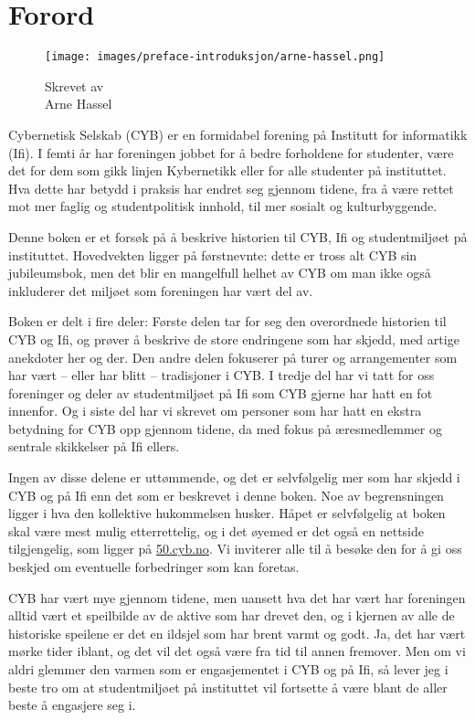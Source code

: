 \chapter*{Forord}

\begin{wrapfigure}{r}{3cm}
\vspace{-180pt}
\centering
\texttt{[image: images/preface-introduksjon/arne-hassel.png]}
\captionsetup{labelformat=empty}
\caption{Skrevet av\\Arne Hassel}
\end{wrapfigure}

Cybernetisk Selskab (CYB) er en formidabel forening på Institutt for informatikk (Ifi). I femti år har foreningen jobbet for å bedre forholdene for studenter, være det for dem som gikk linjen Kybernetikk eller for alle studenter på instituttet. Hva dette har betydd i praksis har endret seg gjennom tidene, fra å være rettet mot mer faglig og studentpolitisk innhold, til mer sosialt og kulturbyggende.

Denne boken er et forsøk på å beskrive historien til CYB, Ifi og studentmiljøet på instituttet. Hovedvekten ligger på førstnevnte: dette er tross alt CYB sin jubileumsbok, men det blir en mangelfull helhet av CYB om man ikke også inkluderer det miljøet som foreningen har vært del av.

Boken er delt i fire deler: Første delen tar for seg den overordnede historien til CYB og Ifi, og prøver å beskrive de store endringene som har skjedd, med artige anekdoter her og der. Den andre delen fokuserer på turer og arrangementer som har vært -- eller har blitt -- tradisjoner i CYB. I tredje del har vi tatt for oss foreninger og deler av studentmiljøet på Ifi som CYB gjerne har hatt en fot innenfor. Og i siste del har vi skrevet om personer som har hatt en ekstra betydning for CYB opp gjennom tidene, da med fokus på æresmedlemmer og sentrale skikkelser på Ifi ellers.

Ingen av disse delene er uttømmende, og det er selvfølgelig mer som har skjedd i CYB og på Ifi enn det som er beskrevet i denne boken. Noe av begrensningen ligger i hva den kollektive hukommelsen husker. Håpet er selvfølgelig at boken skal være mest mulig etterrettelig, og i det øyemed er det også en nettside tilgjengelig, som ligger på \url{50.cyb.no}. Vi inviterer alle til å besøke den for å gi oss beskjed om eventuelle forbedringer som kan foretas.

CYB har vært mye gjennom tidene, men uansett hva det har vært har foreningen alltid vært et speilbilde av de aktive som har drevet den, og i kjernen av alle de historiske speilene er det en ildsjel som har brent varmt og godt. Ja, det har vært mørke tider iblant, og det vil det også være fra tid til annen fremover. Men om vi aldri glemmer den varmen som er engasjementet i CYB og på Ifi, så lever jeg i beste tro om at studentmiljøet på instituttet vil fortsette å være blant de aller beste å engasjere seg i.

